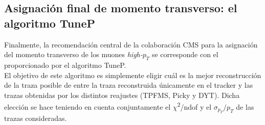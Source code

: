 \subsection{Asignaci\'on final de momento transverso: el algoritmo TuneP}\label{sec:TuneP}

Finalmente, la recomendaci\'on central de la colaboraci\'on CMS para la asignaci\'on del momento transverso de los muones \textit{high-$p_{T}$} se corresponde con el proporcionado por el algoritmo TuneP. \\
 El objetivo de este algoritmo es simplemente eligir cu\'al es la mejor reconstrucci\'on de la traza posible de entre la traza reconstruida \'unicamente en el tracker y las trazas obtenidas por los distintos reajustes (TPFMS, Picky y DYT). Dicha elecci\'on se hace teniendo en cuenta conjuntamente el $\chi$\textsuperscript{2}/ndof y el $\sigma_{p_{T}}/p_{T}$ de las trazas consideradas.
